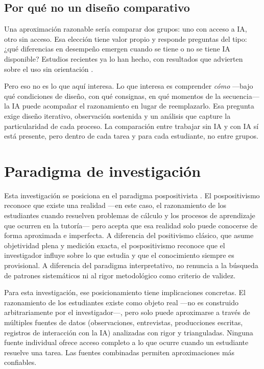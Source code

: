 \subsection{Por qué no un diseño comparativo}

Una aproximación razonable sería comparar dos grupos: uno con acceso a IA, otro sin acceso. Esa elección tiene valor propio y responde preguntas del tipo: ¿qué diferencias en desempeño emergen cuando se tiene o no se tiene IA disponible? Estudios recientes ya lo han hecho, con resultados que advierten sobre el uso sin orientación \parencite{bastani2025guardrails,mateo2024estrategia}.

Pero eso no es lo que aquí interesa. Lo que interesa es comprender \emph{cómo} ---bajo qué condiciones de diseño, con qué consignas, en qué momentos de la secuencia--- la IA puede acompañar el razonamiento en lugar de reemplazarlo. Esa pregunta exige diseño iterativo, observación sostenida y un análisis que capture la particularidad de cada proceso. La comparación entre trabajar sin IA y con IA sí está presente, pero dentro de cada tarea y para cada estudiante, no entre grupos.

\section{Paradigma de investigación}

Esta investigación se posiciona en el paradigma pospositivista \parencite{phillipsBurbules2000, creswell2014research}. El pospositivismo reconoce que existe una realidad ---en este caso, el razonamiento de los estudiantes cuando resuelven problemas de cálculo y los procesos de aprendizaje que ocurren en la tutoría--- pero acepta que esa realidad solo puede conocerse de forma aproximada e imperfecta. A diferencia del positivismo clásico, que asume objetividad plena y medición exacta, el pospositivismo reconoce que el investigador influye sobre lo que estudia y que el conocimiento siempre es provisional. A diferencia del paradigma interpretativo, no renuncia a la búsqueda de patrones sistemáticos ni al rigor metodológico como criterio de validez.

Para esta investigación, ese posicionamiento tiene implicaciones concretas. El razonamiento de los estudiantes existe como objeto real ---no es construido arbitrariamente por el investigador---, pero solo puede aproximarse a través de múltiples fuentes de datos (observaciones, entrevistas, producciones escritas, registros de interacción con la IA) analizadas con rigor y trianguladas. Ninguna fuente individual ofrece acceso completo a lo que ocurre cuando un estudiante resuelve una tarea. Las fuentes combinadas permiten aproximaciones más confiables.

